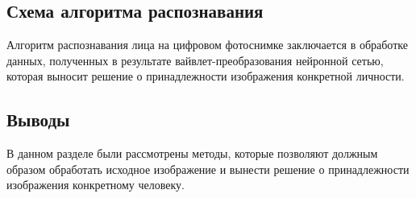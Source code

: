 \subsection{Схема алгоритма распознавания}

Алгоритм распознавания лица на цифровом фотоснимке заключается в обработке данных, полученных
в результате вайвлет-преобразования нейронной сетью, которая выносит решение о принадлежности
изображения конкретной личности.

\subsection*{Выводы}

В данном разделе были рассмотрены методы, которые позволяют должным образом
обработать исходное изображение и вынести решение о принадлежности изображения конкретному человеку.

\clearpage
